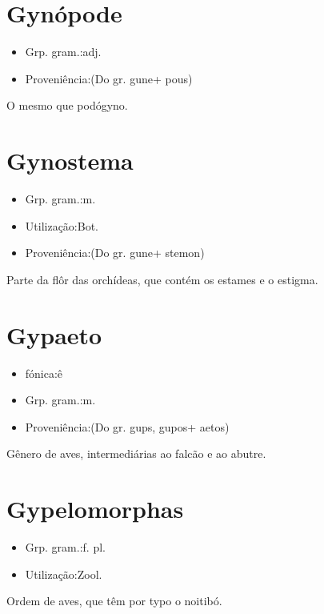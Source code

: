 \section{Gynópode}
\begin{itemize}
\item {Grp. gram.:adj.}
\end{itemize}
\begin{itemize}
\item {Proveniência:(Do gr. \textunderscore gune\textunderscore  + \textunderscore pous\textunderscore )}
\end{itemize}
O mesmo que \textunderscore podógyno\textunderscore .
\section{Gynostema}
\begin{itemize}
\item {Grp. gram.:m.}
\end{itemize}
\begin{itemize}
\item {Utilização:Bot.}
\end{itemize}
\begin{itemize}
\item {Proveniência:(Do gr. \textunderscore gune\textunderscore  + \textunderscore stemon\textunderscore )}
\end{itemize}
Parte da flôr das orchídeas, que contém os estames e o estigma.
\section{Gypaeto}
\begin{itemize}
\item {fónica:ê}
\end{itemize}
\begin{itemize}
\item {Grp. gram.:m.}
\end{itemize}
\begin{itemize}
\item {Proveniência:(Do gr. \textunderscore gups\textunderscore , \textunderscore gupos\textunderscore  + \textunderscore aetos\textunderscore )}
\end{itemize}
Gênero de aves, intermediárias ao falcão e ao abutre.
\section{Gypelomorphas}
\begin{itemize}
\item {Grp. gram.:f. pl.}
\end{itemize}
\begin{itemize}
\item {Utilização:Zool.}
\end{itemize}
Ordem de aves, que têm por typo o noitibó.
